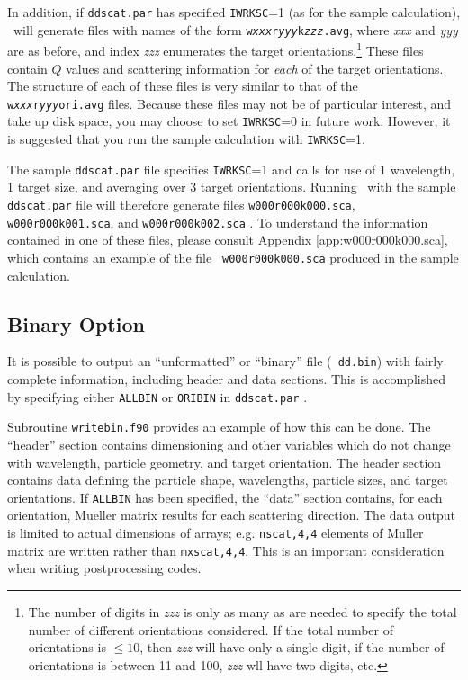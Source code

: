 In addition, if {\tt ddscat.par} has specified {\tt IWRKSC}=1 (as for
the sample calculation), \ddscatv\ will generate files with
names of the form {\tt w{\it xxx}r{\it yyy}k{\it zzz}.avg}, where {\it
xxx} and {\it yyy} are as before, and index {\it zzz}
enumerates the
target orientations.\footnote{%
   The number of digits in {\it zzz} is only as many as are needed to
   specify the total number of different orientations considered.  
   If the total number of orientations is $\leq10$,
   then {\it zzz} will have only a single digit, if the number of orientations
   is between 11 and 100, {\it zzz} wll have two digits, etc.}
These files contain $Q$ values and
scattering information for {\it each} of the target orientations.
The structure of each of these files is very similar to that of the {\tt
w{\it xxx}r{\it yyy}ori.avg} files.  Because these files may not be of
particular interest, and take up disk space, you may choose to set
{\tt IWRKSC}=0 in future work.  However, it is suggested that you run
the sample calculation with {\tt IWRKSC}=1.

The sample {\tt ddscat.par} file specifies {\tt IWRKSC}=1 and calls
for use of 1 wavelength, 1 target size, and averaging over 3 target
orientations.  Running \ddscatv\ with the sample {\tt
ddscat.par} file will therefore generate files {\tt w000r000k000.sca},
{\tt w000r000k001.sca}, and {\tt w000r000k002.sca} .  To understand the
information contained in one of these files, please consult Appendix
\ref{app:w000r000k000.sca}, which contains an example of the file {\tt
w000r000k000.sca} produced in the sample calculation.

\subsection{ Binary Option\label{subsec:binary}}

It is possible to output an ``unformatted'' or ``binary'' file ({\tt
dd.bin}) with fairly complete information, including header and data
sections.  This is accomplished by specifying either {\tt ALLBIN} or
{\tt ORIBIN} in {\tt ddscat.par} .

Subroutine {\tt writebin.f90} provides an example of how this can be
done.  The ``header'' section contains dimensioning and other
variables which do not change with wavelength, particle geometry, and
target orientation.  The header section contains data defining the
particle shape, wavelengths, particle sizes, and target orientations.
If {\tt ALLBIN} has been specified, the ``data'' section contains, for
each orientation, Mueller matrix results for each scattering
direction.  The data output is limited to actual dimensions of arrays;
e.g. {\tt nscat,4,4} elements of Muller matrix are written rather than
{\tt mxscat,4,4}.  This is an important consideration when writing
postprocessing codes.


